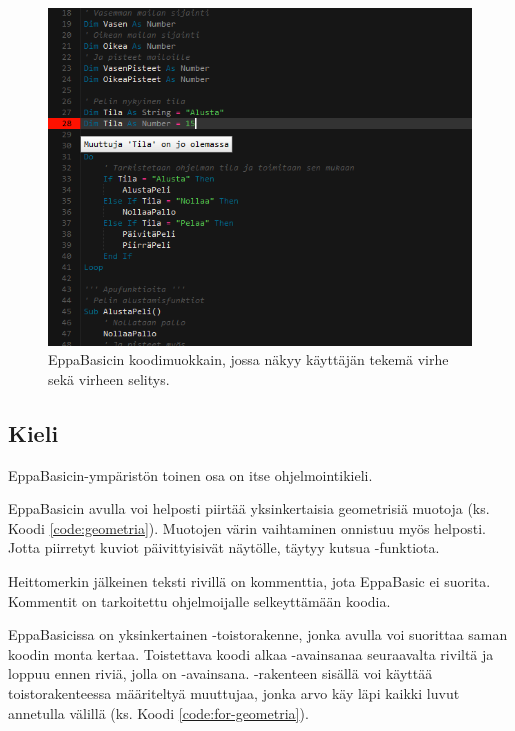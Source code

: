 \begin{figure}[h]
    \centering
    \includegraphics[width=1\textwidth]{virhe}
    \caption{EppaBasicin koodimuokkain, jossa näkyy käyttäjän tekemä virhe sekä virheen selitys.}
    \label{img:virhe}
\end{figure}

\subsection{Kieli}
EppaBasicin-ympäristön toinen osa on
itse ohjelmointikieli.

EppaBasicin avulla voi helposti
piirtää yksinkertaisia geometrisiä
muotoja (ks. Koodi \ref{code:geometria}).
Muotojen värin vaihtaminen
onnistuu myös helposti.
Jotta piirretyt kuviot
päivittyisivät näytölle,
täytyy kutsua
-funktiota.

Heittomerkin  jälkeinen
teksti rivillä on kommenttia,
jota EppaBasic ei suorita.
Kommentit on tarkoitettu
ohjelmoijalle selkeyttämään
koodia.


EppaBasicissa on yksinkertainen
-toistorakenne, jonka
avulla voi suorittaa saman
koodin monta kertaa.
Toistettava koodi alkaa
-avainsanaa seuraavalta
riviltä ja loppuu ennen riviä,
jolla on -avainsana.
-rakenteen sisällä voi
käyttää toistorakenteessa määriteltyä
muuttujaa, jonka arvo käy läpi
kaikki luvut annetulla välillä
(ks. Koodi \ref{code:for-geometria}).

